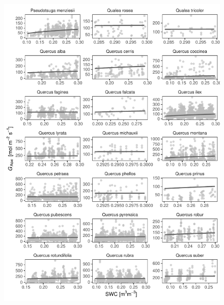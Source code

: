 \documentclass[11pt,twoside]{reedthesis}
\begin{document}
\begin{figure}[H]

{\centering \includegraphics[width=1\linewidth]{figure/appendixD/ggg14} 

}

\end{figure}
\end{document}
